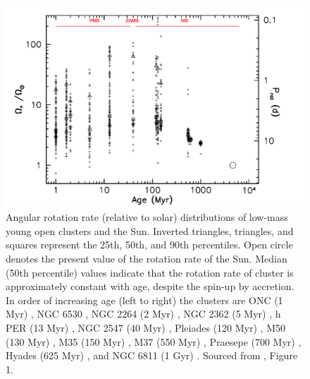 \begin{figure}
  \includegraphics[width=\textwidth]{Figures/intro_figures/pms_evo.png}
  \caption[Angular rotation rate distributions of low-mass young open clusters and the Sun over time.]{Angular rotation rate (relative to solar) distributions of low-mass young open clusters and the Sun. Inverted triangles, triangles, and squares represent the 25th, 50th, and 90th percentiles. Open circle denotes the present value of the rotation rate of the Sun. Median (50th percentile) values indicate that the rotation rate of cluster is approximately constant with age, despite the spin-up by accretion. In order of increasing age (left to right) the clusters are ONC (1 Myr) \citep{herbst_stellar_2002}, NGC 6530 \citep{henderson_time-series_2012}, NGC 2264 (2 Myr) \citep{affer_rotation_2013}, NGC 2362 (5 Myr) \citep{irwin_monitor_2008}, h PER (13 Myr) \citep{moraux_monitor_2013}, NGC 2547 (40 Myr) \citep{irwin_monitor_2008}, Pleiades (120 Myr) \citep{hartman_large_2010}, M50 (130 Myr) \citep{irwin_monitor_2009}, M35 (150 Myr) \citep{meibom_slar_2009}, M37 (550 Myr) \citep{hartman_deep_2009}, Praesepe (700 Myr) \citep{delorme_stellar_2011}, Hyades (625 Myr) \citep{delorme_stellar_2011}, and NGC 6811 (1 Gyr) \citep{meibom_kepler_2011}. Sourced from \citet{gallet_improved_2013}, Figure 1.}
  \label{fig:pms_ms_evo}
\end{figure}

